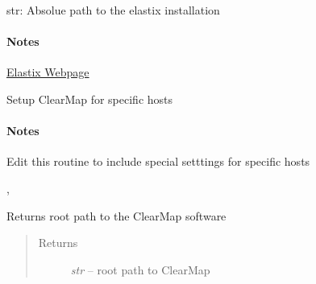 \documentclass[letterpaper,10pt,english]{sphinxmanual}
\begin{document}

\begin{fulllineitems}
\label{api/ClearMap.Settings:ClearMap.Settings.ElastixPath}
str: Absolue path to the elastix installation
\paragraph{Notes}

\href{http://elastix.isi.uu.nl/}{Elastix Webpage}

\end{fulllineitems}


\begin{fulllineitems}
\label{api/ClearMap.Settings:ClearMap.Settings.setup}
Setup ClearMap for specific hosts
\paragraph{Notes}

Edit this routine to include special setttings for specific hosts




{\hyperref[api/ClearMap.Settings:ClearMap.Settings.IlastikPath]{\emph{}}}, {\hyperref[api/ClearMap.Settings:ClearMap.Settings.ElastixPath]{\emph{}}}



\end{fulllineitems}


\begin{fulllineitems}
\label{api/ClearMap.Settings:ClearMap.Settings.clearMapPath}
Returns root path to the ClearMap software
\begin{quote}\begin{description}
\item[{Returns}] \leavevmode
\emph{str} --
root path to ClearMap

\end{description}\end{quote}

\end{fulllineitems}
\end{document}
